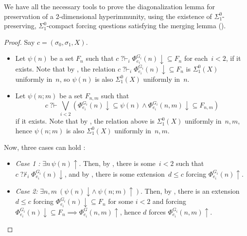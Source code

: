 \documentclass{article}
\def\Hc{\mathcal{H}}
\newcommand{\qvdash}{\operatorname{{?}{\vdash}}}
\newcommand{\nqvdash}{\operatorname{{?}{\nvdash}}}
\def\Hc{\mathcal{H}}
\numberwithin{theorem}{section}
\newtheorem{lemma}[theorem]{Lemma}
\theoremstyle{definition}
\begin{document}
We have all the necessary tools to prove the diagonalization lemma for preservation of a 2-dimensional hyperimmunity, using the existence of $\Sigma^0_1$-preserving, $\Sigma^0_1$-compact forcing questions satisfying the merging lemma ().


\begin{proof}
Say $c = (\sigma_0,\sigma_1,X)$.
    \begin{itemize}
        \item Let $\psi(n)$ be a set $F_n$ such that $c \qvdash_i \Phi_{e_i}^{G_i}(n)\downarrow \subseteq F_n$ for each~$i < 2$, if it exists. Note that by , the relation $c \qvdash_i \Phi_{e_i}^{G_i}(n)\downarrow \subseteq F_n$ is $\Sigma_1^0(X)$ uniformly in~$n$, so $\psi(n)$ is also $\Sigma_1^0(X)$ uniformly in~$n$.
        \item Let $\psi(n;m)$ be a set $F_{n,m}$ such that 
        $$c \qvdash \bigvee_{i < 2} (\Phi_{e_i}^{G_i}(n)\downarrow \subseteq \psi(n) \land \Phi_{e_i}^{G_i}(n,m)\downarrow \subseteq F_{n,m})$$
        if it exists. Note that by , the relation above is $\Sigma_1^0(X)$ uniformly in~$n, m$, hence $\psi(n;m)$ is also $\Sigma_1^0(X)$ uniformly in~$n, m$.
    \end{itemize}

    Now, three cases can hold :

    \begin{itemize}

        \item \emph{Case 1 :} $\exists n \, \psi(n) \uparrow$. Then, by , there is some~$i < 2$ such that $c \nqvdash_i \Phi_{e_i}^{G_i}(n)\downarrow$, and by , there is some extension~$d \leq c$ forcing $\Phi_{e_i}^{G_i}(n) \uparrow$.

        \item \emph{Case 2:} $\exists n,m \ (\psi(n)\downarrow \land\ \psi(n;m) \uparrow)$. Then, by , there is an extension~$d \leq c$ forcing $\Phi_{e_i}^{G_i}(n) \downarrow \subseteq F_n$ for some $i<2$ and forcing $\Phi_{e_i}^{G_i}(n) \downarrow \subseteq F_n \implies \Phi_{e_i}^G(n,m)\uparrow$, hence $d$ forces 
        $\Phi_{e_i}^{G_i}(n,m)\uparrow$.


\end{itemize}
\end{proof}
\end{document}
